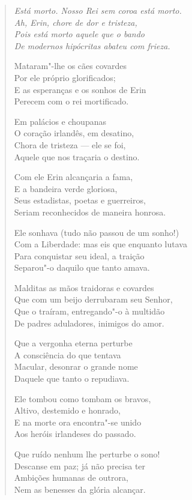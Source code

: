 \begin{verse}\itshape
Está morto.  Nosso Rei sem coroa está morto.\\
Ah, Erin, chore de dor e tristeza,\\
Pois está morto aquele que o bando\\
De modernos hipócritas abateu com frieza.

Mataram"-lhe os cães covardes\\
Por ele próprio glorificados;\\
E as esperanças e os sonhos de Erin\\
Perecem com o rei mortificado.

Em palácios e choupanas\\
O coração irlandês, em desatino,\\
Chora de tristeza --- ele se foi,\\
Aquele que nos traçaria o destino.

Com ele Erin alcançaria a fama,\\
E a bandeira verde gloriosa,\\
Seus estadistas, poetas e guerreiros,\\
Seriam reconhecidos de maneira honrosa.

Ele sonhava (tudo não passou de um sonho!)\\
Com a Liberdade: mas eis que enquanto lutava\\
Para conquistar seu ideal, a traição\\
Separou"-o daquilo que tanto amava.

Malditas as mãos traidoras e covardes\\
Que com um beijo derrubaram seu Senhor,\\
Que o traíram, entregando"-o à multidão\\
De padres aduladores, inimigos do amor.

Que a vergonha eterna perturbe\\
A consciência do que tentava\\
Macular, desonrar o grande nome\\
Daquele que tanto o repudiava.

Ele tombou como tombam os bravos,\\
Altivo, destemido e honrado,\\
E na morte ora encontra"-se unido\\
Aos heróis irlandeses do passado.

Que ruído nenhum lhe perturbe o sono!\\
Descanse em paz; já não precisa ter\\
Ambições humanas de outrora,\\
Nem as benesses da glória alcançar.


\end{verse}
